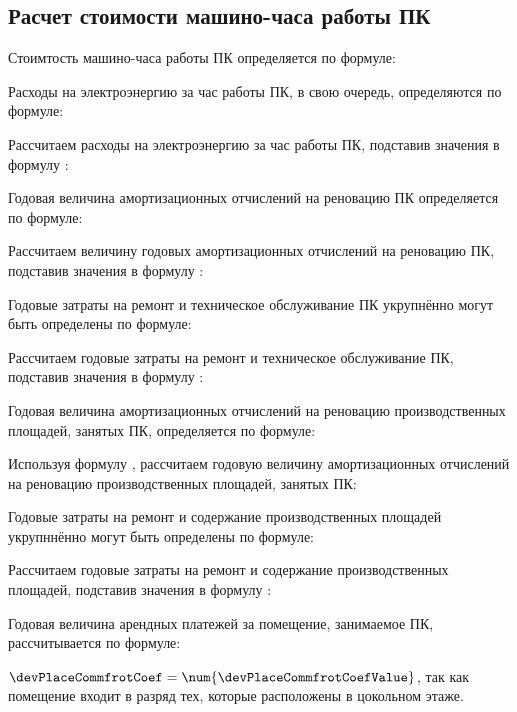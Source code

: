 \subsection{Расчет стоимости машино-часа работы ПК}
\label{sec:economics:cpuclocktime}

Стоимтость машино-часа работы ПК определяется по формуле:
\pcPcHourCostEquation

Расходы на электроэнергию за час работы ПК, в свою очередь, определяются по формуле:
\energyHourCostEquation

Рассчитаем расходы на электроэнергию за час работы ПК, подставив значения в формулу :
\energyHourCostFormulaApplied

Годовая величина амортизационных отчислений на реновацию ПК определяется по формуле:
\pcAmortizationCostEquation

Рассчитаем величину годовых амортизационных отчислений на реновацию ПК, подставив значения в формулу :
\pcAmortizationCostFormulaApplied

Годовые затраты на ремонт и техническое обслуживание ПК укрупнённо могут быть определены по формуле:
\pcPcSupportCostEquation

Рассчитаем годовые затраты на ремонт и техническое обслуживание ПК, подставив значения в формулу :
\pcPcSupportCostFormulaApplied

Годовая величина амортизационных отчислений на реновацию производственных площадей, занятых ПК, определяется по формуле:
\devPlaceAmortizationCostEquation

Используя формулу , рассчитаем годовую величину амортизационных отчислений на реновацию производственных площадей, занятых ПК:
\devPlaceAmortizationCostFormulaApplied

Годовые затраты на ремонт и содержание производственных площадей укрупннённо могут быть определены по формуле:
\devPlaceSupportCostEquation

Рассчитаем годовые затраты на ремонт и содержание производственных площадей, подставив значения в формулу :
\devPlaceSupportCostFormulaApplied

Годовая величина арендных платежей за помещение, занимаемое ПК, рассчитывается по формуле:
\devPlaceRentCostEquation

\(\devPlaceCommfrotCoef = \num{\devPlaceCommfrotCoefValue}\), так как помещение входит в разряд тех, которые расположены в цокольном этаже.

